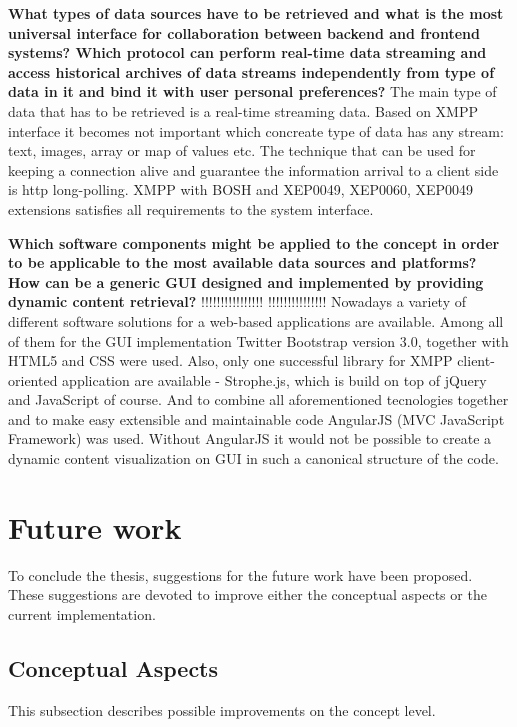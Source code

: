 \textbf{What types of data sources have to be retrieved and what is the most universal interface for collaboration between backend and frontend systems? Which protocol can perform real-time data streaming and access historical archives of data streams independently from type of data in it and bind it with user personal preferences?}
\newline
The main type of data that has to be retrieved is a real-time streaming data. Based on XMPP interface it becomes not important which concreate type of data has any stream: text, images, array or map of values etc. The technique that can be used for keeping a connection alive and guarantee the information arrival to a client side is http long-polling. 
\newline
XMPP with BOSH and XEP0049, XEP0060, XEP0049 extensions satisfies all requirements to the system interface.

\textbf{Which software components might be applied to the concept in order to be applicable to the most available data sources and platforms? How can be a generic GUI designed and implemented by providing dynamic content retrieval?} 
\newline
!!!!!!!!!!!!!!!!
!!!!!!!!!!!!!!!
Nowadays a variety of different software solutions for a web-based applications are available. Among all of them for the GUI implementation Twitter Bootstrap version 3.0, together with HTML5 and CSS were used. Also, only one successful library for XMPP client-oriented application are available - Strophe.js, which is build on top of jQuery and JavaScript of course. And to combine all aforementioned tecnologies together and to make  easy extensible and maintainable code AngularJS (MVC JavaScript Framework) was used. Without AngularJS it would not be possible to create a dynamic content visualization on GUI in such a canonical structure of the code.

\section{Future work}
To conclude the thesis, suggestions for the future work have been proposed. These suggestions are devoted to improve either the conceptual aspects or the current implementation.

\subsection{Conceptual Aspects}
This subsection describes possible improvements on the concept level.

